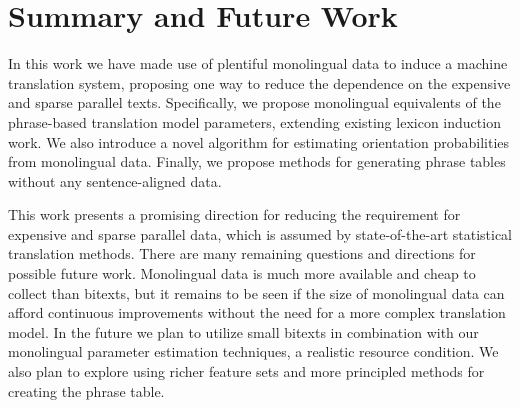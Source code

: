 \documentclass[11pt]{article}
\begin{document}




\section{Summary and Future Work} \label{sect:conc}



In this work we have made use of plentiful monolingual data to induce a machine translation system, proposing one way to reduce the dependence on the expensive and sparse parallel texts.  Specifically, we propose monolingual equivalents of the phrase-based translation model parameters, extending existing lexicon induction work.  We also introduce a novel algorithm for estimating orientation probabilities from monolingual data.  Finally, we propose methods for generating phrase tables without any sentence-aligned data.

This work presents a promising direction for reducing the requirement for expensive and sparse parallel data, which is assumed by state-of-the-art statistical translation methods.  There are many remaining questions and directions for possible future work.  Monolingual data is much more available and cheap to collect than bitexts, but it remains to be seen if the size of monolingual data can afford continuous improvements without the need for a more complex translation model. In the future we plan to utilize small bitexts in combination with our monolingual parameter estimation techniques, a realistic resource condition. We also plan to explore using richer feature sets and more principled methods for creating the phrase table.
\end{document}
